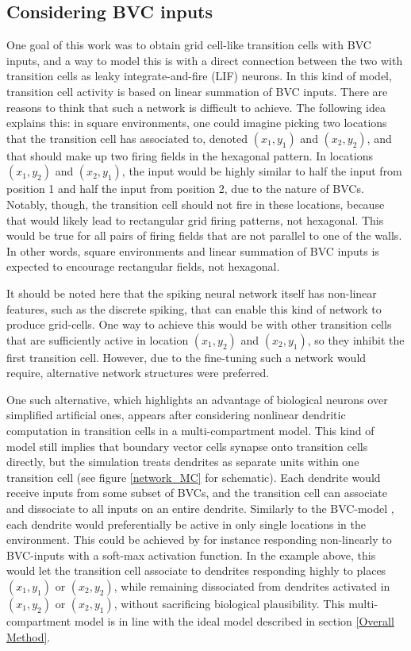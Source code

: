 \documentclass{article}
\begin{document}
    \subsection{Considering BVC inputs} \label{Considering BVC inputs}

    One goal of this work was to obtain grid cell-like transition cells with BVC inputs, and a way to model this is with a direct connection between the two with transition cells as leaky integrate-and-fire (LIF) neurons. In this kind of model, transition cell activity is based on linear summation of BVC inputs. There are reasons to think that such a network is difficult to achieve. The following idea explains this: in square environments, one could imagine picking two locations that the transition cell has associated to, denoted \((x_1, y_1)\) and \((x_2, y_2)\), and that should make up two firing fields in the hexagonal pattern. In locations \((x_1, y_2)\) and \((x_2, y_1)\), the input would be highly similar to half the input from position 1 and half the input from position 2, due to the nature of BVCs. Notably, though, the transition cell should not fire in these locations, because that would likely lead to rectangular grid firing patterns, not hexagonal. This would be true for all pairs of firing fields that are not parallel to one of the walls. In other words, square environments and linear summation of BVC inputs is expected to encourage rectangular fields, not hexagonal.
    
    It should be noted here that the spiking neural network itself has non-linear features, such as the discrete spiking, that can enable this kind of network to produce grid-cells. One way to achieve this would be with other transition cells that are sufficiently active in location \((x_1, y_2)\) and \((x_2, y_1)\), so they inhibit the first transition cell. However, due to the fine-tuning such a network would require, alternative network structures were preferred.

    One such alternative, which highlights an advantage of biological neurons over simplified artificial ones, appears after considering nonlinear dendritic computation in transition cells in a multi-compartment model. This kind of model still implies that boundary vector cells synapse onto transition cells directly, but the simulation treats dendrites as separate units within one transition cell (see figure \ref{network_MC} for schematic). Each dendrite would receive inputs from some subset of BVCs, and the transition cell can associate and dissociate to all inputs on an entire dendrite. Similarly to the BVC-model \parencite{Barry2006}, each dendrite would preferentially be active in only single locations in the environment. This could be achieved by for instance responding non-linearly to BVC-inputs with a soft-max activation function. In the example above, this would let the transition cell associate to dendrites responding highly to places \((x_1, y_1)\) or \((x_2, y_2)\), while remaining dissociated from dendrites activated in \((x_1, y_2)\) or \((x_2, y_1)\), without sacrificing biological plausibility. This multi-compartment model is in line with the ideal model described in section \ref{Overall Method}.
\end{document}
